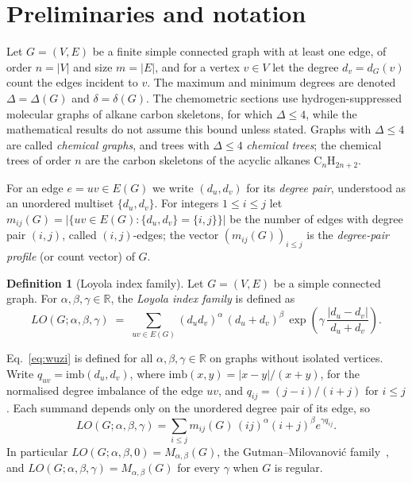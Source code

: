 \documentclass[a5paper, 10pt]{article}
\theoremstyle{plain}
\theoremstyle{remark}
\theoremstyle{definition}
\newtheorem{definition}{Definition}
\newcommand{\Wuzi}{LO(G;\alpha,\beta,\gamma)}
\begin{document}
\section{Preliminaries and notation}\label{sec:prelim}\label{sec:notation}\label{sec:def}

Let $G = (V, E)$ be a finite simple connected graph with at least one edge, of order
$n = |V|$ and size $m = |E|$, and for a vertex $v \in V$ let the degree
$d_v = d_G(v)$ count the edges incident to $v$. The maximum and
minimum degrees are denoted $\Delta = \Delta(G)$ and
$\delta = \delta(G)$. The chemometric sections use hydrogen-suppressed
molecular graphs of alkane carbon skeletons, for which $\Delta \le 4$,
while the mathematical results do not assume this bound unless stated.
Graphs with $\Delta \le 4$ are called \emph{chemical graphs}, and trees
with $\Delta \le 4$ \emph{chemical trees}; the chemical trees of order
$n$ are the carbon skeletons of the acyclic alkanes
$\mathrm{C}_n\mathrm{H}_{2n+2}$.

For an edge $e = uv \in E(G)$ we write $(d_u, d_v)$ for its
\emph{degree pair}, understood as an unordered multiset
$\{d_u, d_v\}$. For integers $1 \le i \le j$ let
$m_{ij}(G) = |\{uv \in E(G) : \{d_u, d_v\} = \{i, j\}\}|$ be the number
of edges with degree pair $(i,j)$, called $(i,j)$-edges; the vector
$(m_{ij}(G))_{i \le j}$ is the \emph{degree-pair profile} (or count
vector) of $G$.

\begin{definition}[Loyola index family]\label{def:wuzi}
Let $G = (V, E)$ be a simple connected graph. For
$\alpha, \beta, \gamma \in \mathbb{R}$, the \emph{Loyola index family}
is defined as
\begin{equation}\label{eq:wuzi}
\Wuzi
\;=\; \sum_{uv \in E(G)}
(d_u d_v)^{\alpha}\,(d_u + d_v)^{\beta}\,
\exp\!\left(\gamma\,\frac{|d_u - d_v|}{d_u + d_v}\right).
\end{equation}
\end{definition}

Eq.~\eqref{eq:wuzi} is defined for all $\alpha, \beta, \gamma \in \mathbb{R}$
on graphs without isolated vertices. Write
$q_{uv} = \mathrm{imb}(d_u, d_v)$, where $\mathrm{imb}(x,y) = |x - y|/(x + y)$,
for the normalised degree imbalance of the edge $uv$, and $q_{ij} = (j - i)/(i + j)$ for $i \le j$. Each
summand depends only on the unordered degree pair of its edge, so
\begin{equation}\label{eq:pairsum}
LO(G;\alpha,\beta,\gamma) = \sum_{i \le j} m_{ij}(G)\,
(ij)^{\alpha}(i+j)^{\beta} e^{\gamma q_{ij}} .
\end{equation}
In particular $LO(G;\alpha,\beta,0) = M_{\alpha,\beta}(G)$, the
Gutman--Milovanovi\'c family~\cite{GutmanMilovanovic2020AKCE, MolinaSigarreta2025GM},
and $LO(G;\alpha,\beta,\gamma) = M_{\alpha,\beta}(G)$ for every
$\gamma$ when $G$ is regular.
\end{document}

